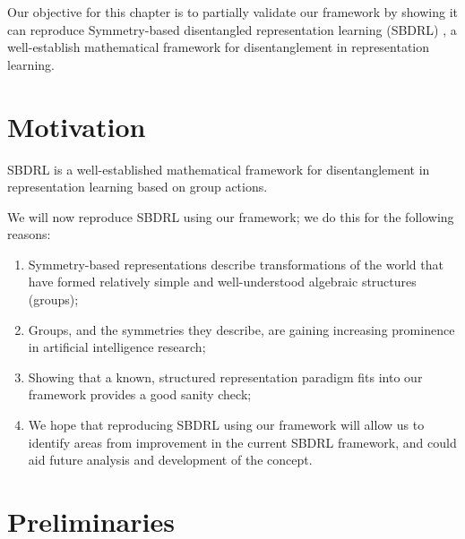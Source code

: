 Our objective for this chapter is to partially validate our framework by showing it can reproduce Symmetry-based disentangled representation learning (SBDRL) \autocite{Higgins2018}, a well-establish mathematical framework for disentanglement in representation learning.

\section{Motivation}

SBDRL is a well-established mathematical framework for disentanglement in representation learning based on group actions.


We will now reproduce SBDRL using our framework; we do this for the following reasons:
\begin{enumerate}
    \item Symmetry-based representations describe transformations of the world that have formed relatively simple and well-understood algebraic structures (groups);
    \item Groups, and the symmetries they describe, are gaining increasing prominence in artificial intelligence research;
    \item Showing that a known, structured representation paradigm fits into our framework provides a good sanity check;
    \item We hope that reproducing SBDRL using our framework will allow us to identify areas from improvement in the current SBDRL framework, and could aid future analysis and development of the concept.
\end{enumerate}


\section{Preliminaries}

